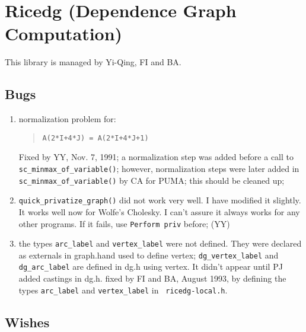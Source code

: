 \newpage
\section{Ricedg (Dependence Graph Computation)}

This library is managed by Yi-Qing, FI and BA.

\subsection{Bugs}

\begin{enumerate}

  \item {} normalization problem for:
        \begin{quote}
\begin{verbatim}
A(2*I+4*J) = A(2*I+4*J+1)
\end{verbatim}
        \end{quote}
        Fixed by YY, Nov. 7, 1991; a normalization step was added before
        a call to \verb+sc_minmax_of_variable()+; 
        however, normalization steps
        were later added in \verb+sc_minmax_of_variable()+ by CA for PUMA;
        this should be cleaned up;
  \item \verb+quick_privatize_graph()+ did not work very well. I have
        modified it slightly. It works well now for Wolfe's Cholesky. I can't assure
        it always works for any other programs. If it fails, use
        \verb+Perform priv+ before; (YY)

      \item the types {\tt arc\_label} and {\tt vertex\_label} were not
        defined. They were declared as externals in graph.hand used to
        define vertex; {\tt dg\_vertex\_label} and {\tt dg\_arc\_label} are
        defined in dg.h using vertex.  It didn't appear until PJ added
        castings in dg.h.  fixed by FI and BA, August 1993, by defining the
        types {\tt arc\_label} and {\tt vertex\_label} in {\tt
        ricedg-local.h}.

\end{enumerate}

\subsection{Wishes}

